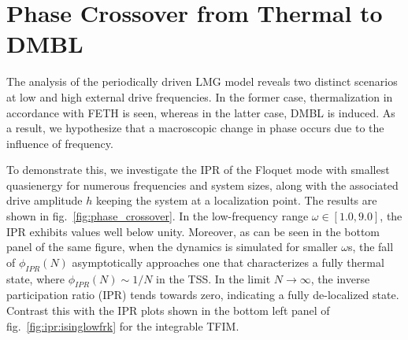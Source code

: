 \documentclass[%
reprint,
superscriptaddress,
amsmath,amssymb,
aps,
prb,
showkeys,
]{revtex4-2}
\begin{document}
\section{\label{sec:level5}Phase Crossover from Thermal to DMBL}
The analysis of the periodically driven LMG model reveals two distinct scenarios at low and high external drive frequencies. In the former case, thermalization in accordance with FETH is seen, whereas in the latter case, DMBL is induced. As a result, we hypothesize that a macroscopic change in phase occurs due to the influence of frequency. 

To demonstrate this, we investigate the IPR of the  Floquet mode with smallest quasienergy for numerous frequencies and system sizes, along with the associated drive amplitude $h$ keeping the system at a localization point. The results are shown in fig.~\ref{fig:phase_crossover}. In the low-frequency range $\omega \in \left[1.0, 9.0\right]$, the IPR exhibits values well below unity.   {Moreover, as can be seen in the bottom panel of the same figure, when the dynamics is simulated for smaller} $\omega$s, {the fall of} $\phi_{IPR}(N)$ {asymptotically approaches one that characterizes a fully thermal state, where} $\phi_{IPR}(N)\sim 1/N$ {in the TSS. } In the limit  $N\rightarrow\infty$, the inverse participation ratio (IPR) tends towards zero, indicating a fully de-localized state. Contrast this with the IPR plots shown in the bottom left panel of fig.~\ref{fig:ipr:isinglowfrk} {for the integrable TFIM}.  
\end{document}
